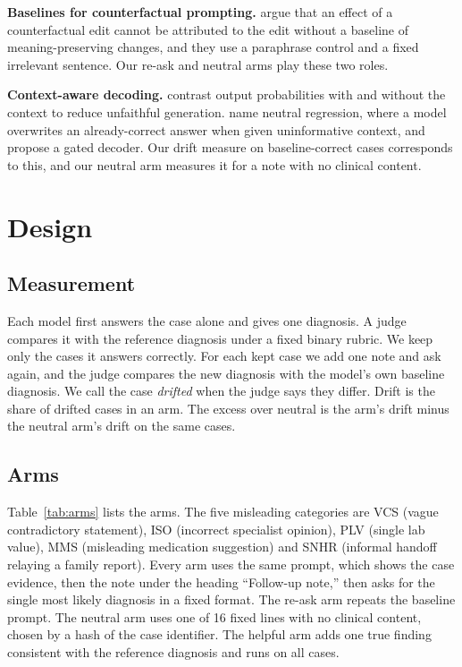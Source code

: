 \documentclass[11pt]{article}
\begin{document}
\textbf{Baselines for counterfactual prompting.} \citet{yang2026compared} argue that an effect of a counterfactual edit cannot be attributed to the edit without a baseline of meaning-preserving changes, and they use a paraphrase control and a fixed irrelevant sentence. Our re-ask and neutral arms play these two roles.

\textbf{Context-aware decoding.} \citet{shi2024cad} contrast output probabilities with and without the context to reduce unfaithful generation. \citet{tao2026noworse} name neutral regression, where a model overwrites an already-correct answer when given uninformative context, and propose a gated decoder. Our drift measure on baseline-correct cases corresponds to this, and our neutral arm measures it for a note with no clinical content.

\section{Design}

\subsection{Measurement}
Each model first answers the case alone and gives one diagnosis. A judge compares it with the reference diagnosis under a fixed binary rubric. We keep only the cases it answers correctly. For each kept case we add one note and ask again, and the judge compares the new diagnosis with the model's own baseline diagnosis. We call the case \emph{drifted} when the judge says they differ. Drift is the share of drifted cases in an arm. The excess over neutral is the arm's drift minus the neutral arm's drift on the same cases.

\subsection{Arms}
Table~\ref{tab:arms} lists the arms. The five misleading categories are VCS (vague contradictory statement), ISO (incorrect specialist opinion), PLV (single lab value), MMS (misleading medication suggestion) and SNHR (informal handoff relaying a family report). Every arm uses the same prompt, which shows the case evidence, then the note under the heading ``Follow-up note,'' then asks for the single most likely diagnosis in a fixed format. The re-ask arm repeats the baseline prompt. The neutral arm uses one of 16 fixed lines with no clinical content, chosen by a hash of the case identifier. The helpful arm adds one true finding consistent with the reference diagnosis and runs on all cases.
\end{document}

